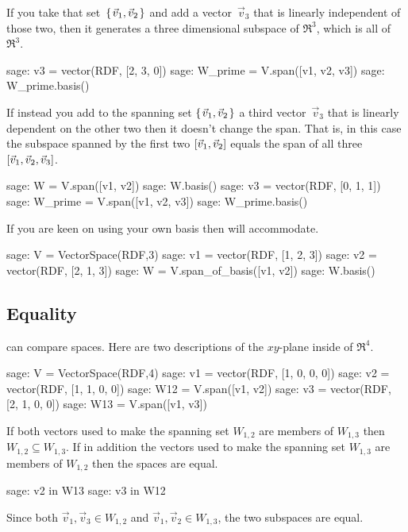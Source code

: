 If you take that set~$\mbox{$\{\hspace{0.1em}\vec{v}_1,\vec{v}_2\hspace{0.1em}\}$}$ and add a vector~$\vec{v}_3$ that is
linearly independent of those two, 
then it generates a three dimensional subspace of $\Re^3$, 
which is all of $\Re^3$.
\begin{sagecommandline}
sage: v3 = vector(RDF, [2, 3, 0])
sage: W_prime = V.span([v1, v2, v3])
sage: W_prime.basis()
\end{sagecommandline}
If instead you add to the spanning set $\mbox{$\{\hspace{0.1em}\vec{v}_1,\vec{v}_2\hspace{0.1em}\}$}$ 
a third vector~$\vec{v}_3$ 
that is linearly dependent on the other two then
it doesn't change the span.
That is, in this case the subspace spanned by the first two
$\relax [\vec{v}_1,\vec{v}_2\relax ]$
equals the span of all three
$\relax [\vec{v}_1,\vec{v}_2,\vec{v}_3\relax ]$.
\begin{sagecommandline}
sage: W = V.span([v1, v2])       
sage: W.basis()
sage: v3 = vector(RDF, [0, 1, 1])
sage: W_prime = V.span([v1, v2, v3])
sage: W_prime.basis()
\end{sagecommandline}

If you are keen on using your own basis then \Sage{} will
accommodate.
\begin{sagecommandline}
sage: V = VectorSpace(RDF,3)
sage: v1 = vector(RDF, [1, 2, 3])
sage: v2 = vector(RDF, [2, 1, 3])
sage: W = V.span_of_basis([v1, v2])
sage: W.basis()
\end{sagecommandline}




\subsection{Equality}

\Sage{} can compare spaces.
Here are two descriptions of the $xy$-plane inside of $\Re^4$.
\begin{sagecommandline}
sage: V = VectorSpace(RDF,4)
sage: v1 = vector(RDF, [1, 0, 0, 0])
sage: v2 = vector(RDF, [1, 1, 0, 0])
sage: W12 = V.span([v1, v2])
sage: v3 = vector(RDF, [2, 1, 0, 0])
sage: W13 = V.span([v1, v3])  
\end{sagecommandline}
If both vectors used to make the spanning set $W_{1,2}$ are 
members of  $W_{1,3}$ then  $W_{1,2}\subseteq W_{1,3}$.
If in addition the vectors used to make the spanning set $W_{1,3}$ are 
members of  $W_{1,2}$ then the spaces are equal.
\begin{sagecommandline}
sage: v2 in W13
sage: v3 in W12
\end{sagecommandline}
Since both $\vec{v}_1,\vec{v}_3\in W_{1,2}$ and 
$\vec{v}_1,\vec{v}_2\in W_{1,3}$, the two subspaces are equal.

